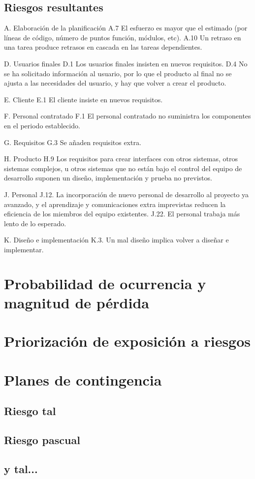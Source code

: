 \documentclass[11pt,a4paper,spanish,twoside]{report}
\begin{document}
\section{Riesgos resultantes}

A. Elaboración de la planificación
A.7 El esfuerzo es mayor que el estimado (por líneas de código, número de
puntos función, módulos, etc).
A.10 Un retraso en una tarea produce retrasos en cascada en las tareas
dependientes.

D. Usuarios finales
D.1 Los usuarios finales insisten en nuevos requisitos.
D.4 No se ha solicitado información al usuario, por lo que el producto al
final no se ajusta a las necesidades del usuario, y hay que volver a crear el
producto.

E. Cliente
E.1 El cliente insiste en nuevos requisitos.

F. Personal contratado
F.1 El personal contratado no suministra los componentes en el periodo
establecido.

G. Requisitos
G.3 Se añaden requisitos extra.

H. Producto
H.9 Los requisitos para crear interfaces con otros sistemas, otros sistemas
complejos, u otros sistemas que no están bajo el control del equipo de
desarrollo suponen un diseño, implementación y prueba no previstos.

J. Personal
J.12. La incorporación de nuevo personal de desarrollo al proyecto ya
avanzado, y el aprendizaje y comunicaciones extra imprevistas reducen la
eficiencia de los miembros del equipo existentes.
J.22. El personal trabaja más lento de lo esperado.

K. Diseño e implementación
K.3. Un mal diseño implica volver a diseñar e implementar.

\chapter{Probabilidad de ocurrencia y magnitud de pérdida} 


\chapter{Priorización de exposición a riesgos}

\chapter{Planes de contingencia}
\section{Riesgo tal}

\section{Riesgo pascual}

\section{y tal...}
\end{document}

